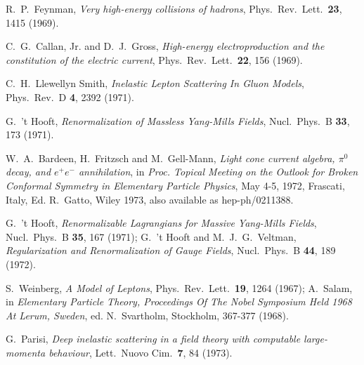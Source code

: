 \documentclass{ws-rv975x65}[12pt]
\begin{document}
\begin{thebibliography}{9}
R.~P.~Feynman,
{\it Very high-energy collisions of hadrons},
  Phys.\ Rev.\ Lett.\  {\bf 23}, 1415 (1969).

C.~G.~Callan, Jr. and D.~J.~Gross,
{\it High-energy electroproduction and the constitution of the electric current},
  Phys.\ Rev.\ Lett.\  {\bf 22}, 156 (1969).

C.~H.~Llewellyn Smith,
{\it Inelastic Lepton Scattering In Gluon Models},
  Phys.\ Rev.\ D {\bf 4}, 2392 (1971).

G.~'t Hooft,
{\it Renormalization of Massless Yang-Mills Fields},
  Nucl.\ Phys.\ B {\bf 33}, 173 (1971).

W.~A.~Bardeen, H.~Fritzsch and M.~Gell-Mann,
{\it Light cone current algebra, $\pi^0$ decay, and $e^+ e^-$ annihilation},
in {\it Proc. Topical Meeting on the Outlook for Broken Conformal Symmetry in Elementary Particle Physics},
May 4-5, 1972, Frascati, Italy, Ed. R.~Gatto, Wiley 1973, also available as hep-ph/0211388.
  
G.~'t Hooft,
{\it Renormalizable Lagrangians for Massive Yang-Mills Fields},
  Nucl.\ Phys.\ B {\bf 35}, 167 (1971);
G.~'t Hooft and M.~J.~G.~Veltman,
{\it Regularization and Renormalization of Gauge Fields},
  Nucl.\ Phys.\ B {\bf 44}, 189 (1972).
  
S.~Weinberg,
{\it A Model of Leptons},
  Phys.\ Rev.\ Lett.\  {\bf 19}, 1264 (1967);
A.~Salam, in {\it Elementary Particle Theory, Proceedings Of The Nobel Symposium Held 1968 At Lerum, Sweden},
ed. N.~Svartholm, Stockholm, 367-377 (1968).

G.~Parisi,
{\it Deep inelastic scattering in a field theory with computable large-momenta behaviour},
Lett.\ Nuovo Cim.\  {\bf 7}, 84 (1973).


\end{thebibliography}
\end{document}
